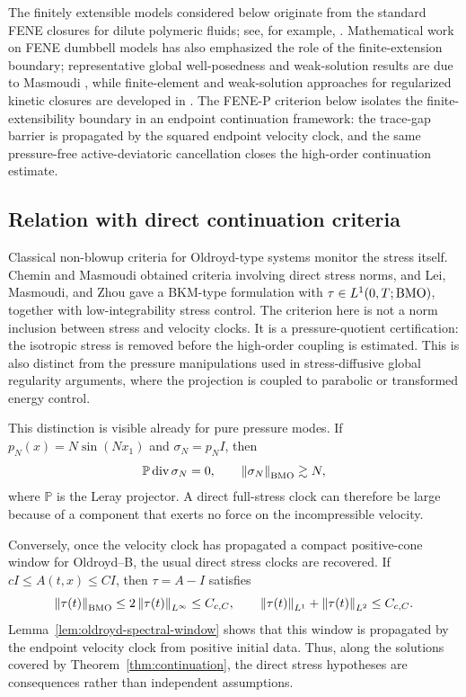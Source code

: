 \documentclass[11pt]{article}
\newcommand{\divv}{\operatorname{div}}
\newcommand{\norm}[1]{\left\lVert #1\right\rVert}
\begin{document}
The finitely extensible models considered below originate from the standard
FENE closures for dilute polymeric fluids; see, for example,
\cite{BirdCurtiss1987,DoiEdwards1986}.  Mathematical work on FENE dumbbell
models has also emphasized the role of the finite-extension boundary; representative global well-posedness and weak-solution results are due to
Masmoudi \cite{Masmoudi2008,Masmoudi2013}, while finite-element and weak-solution
approaches for
regularized kinetic closures are developed in \cite{BarrettSuli2007,BarrettSuli2012}.  The FENE-P criterion below isolates the finite-extensibility boundary in an
endpoint continuation framework: the trace-gap barrier is propagated by the
squared endpoint velocity clock, and the same pressure-free active-deviatoric
cancellation closes the high-order continuation estimate.


\subsection{Relation with direct continuation criteria}

Classical non-blowup criteria for Oldroyd-type systems monitor the stress
itself.  Chemin and Masmoudi obtained criteria involving direct stress norms,
and Lei, Masmoudi, and Zhou gave a BKM-type formulation with
\(\tau\in L^1(0,T;{\rm BMO})\), together with low-integrability stress control.
The criterion here is not a norm inclusion between stress and velocity clocks.
It is a pressure-quotient certification: the isotropic stress is removed before
the high-order coupling is estimated.  This is also distinct from the pressure
manipulations used in stress-diffusive global regularity arguments, where the
projection is coupled to parabolic or transformed energy control.

This distinction is visible already for pure pressure modes.  If
\(p_N(x)=N\sin(Nx_1)\) and \(\sigma_N=p_NI\), then
\[
  \mathbb P\divv \sigma_N=0,
  \qquad
  \norm{\sigma_N}_{{\rm BMO}}\gtrsim N,
\]
where \(\mathbb P\) is the Leray projector.  A direct full-stress clock can
therefore be large because of a component that exerts no force on the
incompressible velocity.

Conversely, once the velocity clock has propagated a compact positive-cone
window for Oldroyd--B, the usual direct stress clocks are recovered.  If
\(cI\le A(t,x)\le CI\), then \(\tau=A-I\) satisfies
\[
  \norm{\tau(t)}_{{\rm BMO}}
  \le 2\norm{\tau(t)}_{L^\infty}
  \le C_{c,C},
  \qquad
  \norm{\tau(t)}_{L^1}+\norm{\tau(t)}_{L^2}
  \le C_{c,C} .
\]
Lemma~\ref{lem:oldroyd-spectral-window} shows that this window is propagated by
the endpoint velocity clock from positive initial data.  Thus, along the
solutions covered by Theorem~\ref{thm:continuation}, the direct stress
hypotheses are consequences rather than independent assumptions.
\end{document}
